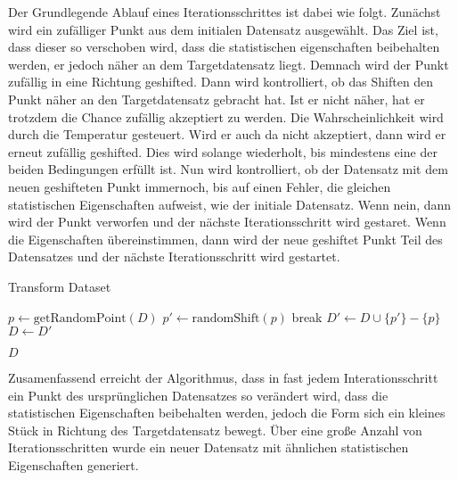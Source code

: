 \documentclass[sigconf]{acmart}
\begin{document}
Der Grundlegende Ablauf eines Iterationsschrittes ist dabei wie folgt. Zunächst wird ein zufälliger Punkt aus dem initialen Datensatz ausgewählt. Das Ziel ist, dass dieser so verschoben wird, dass die statistischen eigenschaften beibehalten werden, er jedoch näher an dem Targetdatensatz liegt. Demnach wird der Punkt zufällig in eine Richtung geshifted. 
Dann wird kontrolliert, ob das Shiften den Punkt näher an den Targetdatensatz gebracht hat. Ist er nicht näher, hat er trotzdem die Chance zufällig akzeptiert zu werden. Die Wahrscheinlichkeit wird durch die Temperatur gesteuert. 
Wird er auch da nicht akzeptiert, dann wird er erneut zufällig geshifted. Dies wird solange wiederholt, bis mindestens eine der beiden Bedingungen erfüllt ist. 
Nun wird kontrolliert, ob der Datensatz mit dem neuen geshifteten Punkt immernoch, bis auf einen Fehler, die gleichen statistischen Eigenschaften aufweist, wie der initiale Datensatz. Wenn nein, dann wird der Punkt verworfen und der nächste Iterationsschritt wird gestaret. Wenn die Eigenschaften übereinstimmen, dann wird der neue geshiftet Punkt Teil des Datensatzes und der nächste Iterationsschritt wird gestartet. 


\begin{algorithm}
  \caption{Transform Dataset}\label{alg:transform}
  \begin{algorithmic}

    \State $p \gets \text{getRandomPoint}(D) $
      \State $p' \gets \text{randomShift}(p)$
        \State break
      \EndIf
    \EndWhile
    \State $D' \gets D \cup \{p' \} - \{p \}$ 
      \State $D \gets D'$
    \EndIf

  \EndFor
  \State \Return $D$

  \EndFunction
  \end{algorithmic}
\end{algorithm}

Zusamenfassend erreicht der Algorithmus, dass in fast jedem Interationsschritt ein Punkt des ursprünglichen Datensatzes so verändert wird, dass die statistischen Eigenschaften beibehalten werden, jedoch die Form sich ein kleines Stück in Richtung des Targetdatensatz bewegt. Über eine große Anzahl von Iterationsschritten wurde ein neuer Datensatz mit ähnlichen statistischen Eigenschaften generiert.
  
\end{document}
